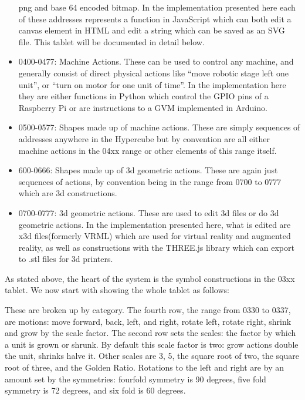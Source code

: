 \documentclass[12pt,a4paper]{amsart}
\numberwithin{equation}{section}
\begin{document}
\begin{itemize}
  png and base 64 encoded bitmap. In the implementation presented here
  each of these addresses represents a function in JavaScript which can
  both edit a canvas element in HTML and edit a string which can be
  saved as an SVG file. This tablet will be documented in detail below.
\item
  0400-0477: Machine Actions. These can be used to control any machine,
  and generally consist of direct physical actions like ``move robotic
  stage left one unit'', or ``turn on motor for one unit of time''. In
  the implementation here they are either functions in Python which
  control the GPIO pins of a Raspberry Pi or are instructions to a GVM
  implemented in Arduino.\\
\item
  0500-0577: Shapes made up of machine actions. These are simply
  sequences of addresses anywhere in the Hypercube but by convention are
  all either machine actions in the 04xx range or other elements of this
  range itself.
\item
  600-0666: Shapes made up of 3d geometric actions. These are again just
  sequences of actions, by convention being in the range from 0700 to
  0777 which are 3d constructions.
\item
  0700-0777: 3d geometric actions. These are used to edit 3d files or do
  3d geometric actions. In the implementation presented here, what is
  edited are x3d files(formerly VRML) which are used for virtual reality
  and augmented reality, as well as constructions with the THREE.js
  library which can export to .stl files for 3d printers.
\end{itemize}

As stated above, the heart of the system is the symbol constructions in
the 03xx tablet. We now start with showing the whole tablet as follows:

\begin{figure}[htbp]
\centering
\caption{}
\end{figure}

These are broken up by category. The fourth row, the range from 0330 to
0337, are motions: move forward, back, left, and right, rotate left,
rotate right, shrink and grow by the scale factor. The second row sets
the scales: the factor by which a unit is grown or shrunk. By default
this scale factor is two: grow actions double the unit, shrinks halve
it. Other scales are 3, 5, the square root of two, the square root of
three, and the Golden Ratio. Rotations to the left and right are by an
amount set by the symmetries: fourfold symmetry is 90 degrees, five fold
symmetry is 72 degrees, and six fold is 60 degrees.
\end{document}
